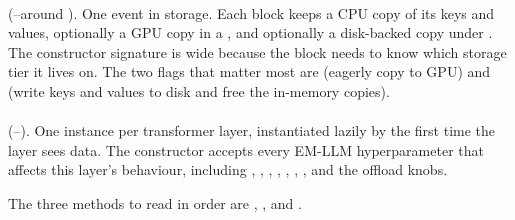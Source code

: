 \paragraph{} (--around ). One event in storage. Each block keeps a CPU copy of its keys and values, optionally a GPU copy in a , and optionally a disk-backed copy under . The constructor signature is wide because the block needs to know which storage tier it lives on. The two flags that matter most are  (eagerly copy to GPU) and  (write keys and values to disk and free the in-memory copies).

\paragraph{} (--). One instance per transformer layer, instantiated lazily by  the first time the layer sees data. The constructor accepts every EM-LLM hyperparameter that affects this layer's behaviour, including , , , , , , , and the offload knobs.

The three methods to read in order are , , and .

